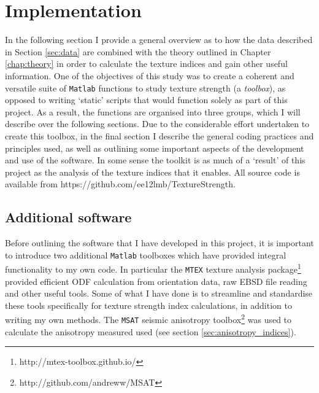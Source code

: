 \documentclass[a4paper,12pt,twoside]{report}
\numberwithin{equation}{chapter}
\begin{document}
\section{Implementation}

In the following section I provide a general overview as to how the data described in Section \ref{sec:data} are combined with the theory outlined in Chapter \ref{chap:theory} in order to calculate the texture indices and gain other useful information. One of the objectives of this study was to create a coherent and versatile suite of \texttt{Matlab} functions to study texture strength (a \emph{toolbox}), as opposed to writing \lq{}static\rq{} scripts that would function solely as part of this project. As a result, the functions are organised into three groups, which I will describe over the following sections. Due to the considerable effort undertaken to create this toolbox, in the final section I describe the general coding practices and principles used, as well as outlining some important aspects of the development and use of the software. In some sense the toolkit is as much of a \lq{}result\rq{} of this project as the analysis of the texture indices that it enables. All source code is available from https://github.com/ee12lmb/TextureStrength.                                                                                                     


\subsection{Additional software}
Before outlining the software that I have developed in this project, it is important to introduce two additional \texttt{Matlab} toolboxes which have provided integral functionality to my own code. In particular the \texttt{MTEX} texture analysis package\footnote{http://mtex-toolbox.github.io/} \citep{Bachmann2010,Mainprice} provided efficient ODF calculation from orientation data, raw EBSD file reading and other useful tools. Some of what I have done is to streamline and standardise these tools specifically for texture strength index calculations, in addition to writing my own methods. The \texttt{MSAT} seismic anisotropy toolbox\footnote{http://github.com/andreww/MSAT} \citep{Walker} was used to calculate the anisotropy measured used (see section \ref{sec:anisotropy_indices}).    
\end{document}
